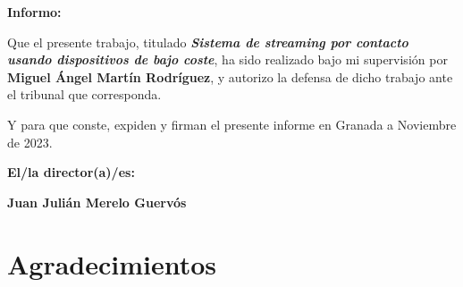 \vspace{0.5cm}

\textbf{Informo:}

\vspace{0.5cm}

Que el presente trabajo, titulado \textit{\textbf{Sistema de streaming por contacto usando dispositivos de bajo coste}},
ha sido realizado bajo mi supervisión por \textbf{Miguel Ángel Martín Rodríguez}, y autorizo la defensa de dicho trabajo ante el tribunal
que corresponda.

\vspace{0.5cm}

Y para que conste, expiden y firman el presente informe en Granada a Noviembre de 2023.

\vspace{1cm}

\textbf{El/la director(a)/es: }

\vspace{5cm}

\noindent \textbf{Juan Julián Merelo Guervós}

\chapter*{Agradecimientos}




